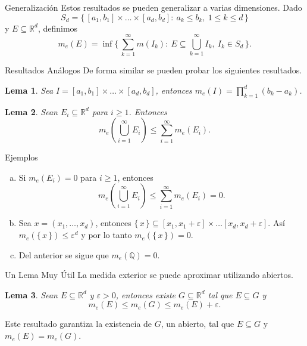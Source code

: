 \documentclass[utf8]{beamer}
\theoremstyle{plain}
\newtheorem{Lem}{Lema}                 %
\theoremstyle{definition}
\theoremstyle{remark}
\numberwithin{equation}{section}
\newcommand{\eps}{\varepsilon}          %
\newcommand{\bQ}{\mathbb{Q}}    %
\newcommand{\bR}{\mathbb{R}}    %
\newcommand{\set}[1]{\{\,#1\,\}}    %
\newcommand{\Set}[1]{\biggl\{\,#1\,\biggr\}} %
\newcommand{\x}{\times}
\renewcommand{\geq}{\geqslant}          %
\renewcommand{\leq}{\leqslant}          %
\newcommand{\suci}{_{i=1}^\infty} %
\newcommand{\suck}{_{k=1}^\infty} %
\renewcommand{\.}{\Cdot}                %
\begin{document}
\begin{frame}{Generalización}
  Estos resultados se pueden generalizar a varias dimensiones. Dado 
  $$S_d=\set{[a_1,b_1]\x\dots\x[a_d,b_d]:\ a_k\leq b_k,\ 1\leq k\leq d}$$
  y $E\subseteq\bR^d$, definimos 
  $$m_e(E)=\inf\Set{\sum\suck m(I_k):\ E\subseteq \bigcup\suck I_k,\ I_k\in S_d}.$$
 
\end{frame}

\begin{frame}{Resultados Análogos}
  De forma similar se pueden probar los siguientes resultados.
  \begin{Lem}\label{lem:medidaCajaDDim}
    Sea $I=[a_1,b_1]\x\dots\x[a_d,b_d]$, entonces $m_e(I)=\prod_{k=1}^d(b_k-a_k)$.
  \end{Lem}
  \begin{Lem}\label{lem:subaditividadEnDDim}
    Sean $E_i\subseteq\bR^d$ para $i\geq 1$. Entonces 
    $$m_e\left(\bigcup\suci E_i\right)\leq\sum\suci m_e(E_i).$$
  \end{Lem}
\end{frame}

\begin{frame}{Ejemplos}
  \begin{enumerate}[a)]
    \item Si $m_e(E_i)=0$ para $i\geq 1$, entonces
    $$m_e\left(\bigcup\suci E_i\right)\leq \sum\suci m_e(E_i)=0.$$
    \item Sea $x=(x_1,\dots,x_d)$, entonces $\set{x}\subseteq[x_1,x_1+\eps]\x\dots[x_d,x_d+\eps]$. Así $m_e(\set{x})\leq \eps^d$ y por lo tanto $m_e(\set{x})=0$.
    \item Del anterior se sigue que $m_e(\bQ)=0$.
  \end{enumerate}
\end{frame}

\begin{frame}{Un Lema Muy Útil}
  La medida exterior se puede aproximar utilizando abiertos.
  \begin{Lem}\label{lem:aproxConAbiertos}
    Sean $E\subseteq\bR^d$ y $\eps>0$, entonces existe $G\subseteq\bR^d$ tal que $E\subseteq G$ y 
    $$m_e(E)\leq m_e(G)\leq m_e(E)+\eps.$$
  \end{Lem}
  Este resultado garantiza la existencia de $G$, un abierto, tal que $E\subseteq G$ y $m_e(E)=m_e(G)$.
\end{frame}
\end{document}
